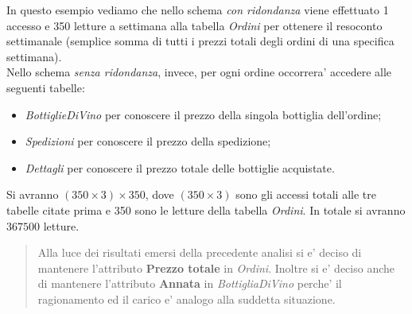 \begin{flushleft}
In questo esempio vediamo che nello schema \emph{con ridondanza} viene effettuato 1 accesso e 350 letture a settimana alla tabella \emph{Ordini} per ottenere il resoconto settimanale (semplice somma di tutti i prezzi totali degli ordini di una specifica settimana).\\
\vspace{0.5cm}
Nello schema \emph{senza ridondanza}, invece, per ogni ordine occorrera' accedere alle seguenti tabelle:
\begin{itemize}
	\item \emph{BottiglieDiVino} per conoscere il prezzo della singola bottiglia dell'ordine;
	\item \emph{Spedizioni} per conoscere il prezzo della spedizione;
	\item \emph{Dettagli} per conoscere il prezzo totale delle bottiglie acquistate.
\end{itemize}
Si avranno $(350\times3)\times350$, dove $(350\times3)$ sono gli accessi totali alle tre tabelle citate prima e 350 sono le letture della tabella \emph{Ordini}. In totale si avranno $367500$ letture.\\
\begin{verse}
	Alla luce dei risultati emersi della precedente analisi si e' deciso di mantenere l'attributo \textbf{Prezzo totale} in \emph{Ordini}. Inoltre si e' deciso anche di mantenere l'attributo \textbf{Annata} in \emph{BottigliaDiVino} perche' il ragionamento ed il carico e' analogo alla suddetta situazione.
\end{verse} 
\end{flushleft}
